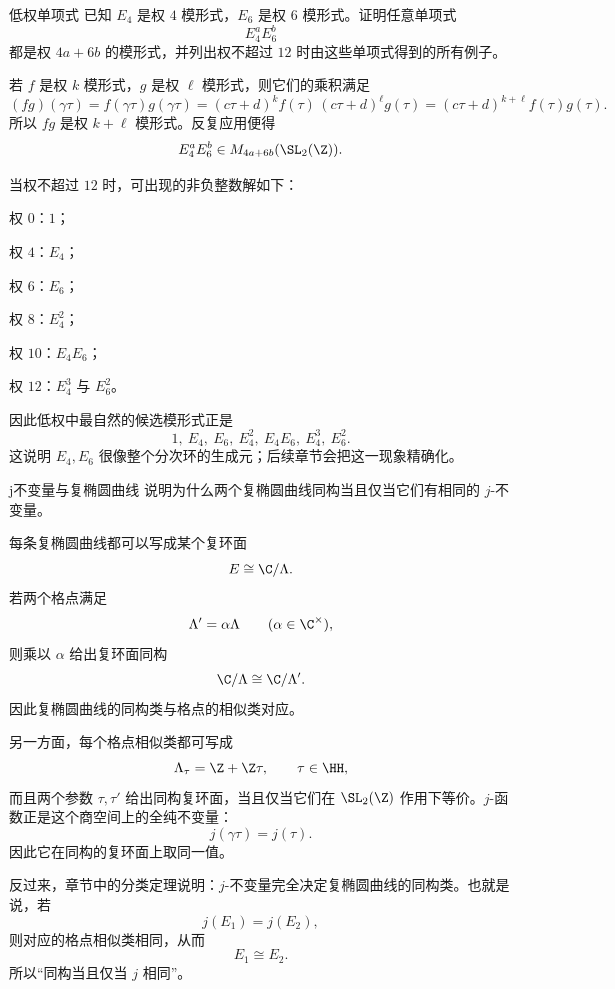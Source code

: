 \begin{problem}{低权单项式}
\hard
已知 $E_4$ 是权 $4$ 模形式，$E_6$ 是权 $6$ 模形式。证明任意单项式
\[
E_4^aE_6^b
\]
都是权 $4a+6b$ 的模形式，并列出权不超过 $12$ 时由这些单项式得到的所有例子。
\end{problem}
\begin{solution}
若 $f$ 是权 $k$ 模形式，$g$ 是权 $\ell$ 模形式，则它们的乘积满足
\[
(fg)(\gamma\tau)=f(\gamma\tau)g(\gamma\tau)
=(c\tau+d)^k f(\tau)\,(c\tau+d)^\ell g(\tau)
=(c\tau+d)^{k+\ell}f(\tau)g(\tau).
\]
所以 $fg$ 是权 $k+\ell$ 模形式。反复应用便得
\[
E_4^aE_6^b\in M_{4a+6b}(\SL_2(\Z)).
\]

当权不超过 $12$ 时，可出现的非负整数解如下：

权 $0$：$1$；

权 $4$：$E_4$；

权 $6$：$E_6$；

权 $8$：$E_4^2$；

权 $10$：$E_4E_6$；

权 $12$：$E_4^3$ 与 $E_6^2$。

因此低权中最自然的候选模形式正是
\[
1,\ E_4,\ E_6,\ E_4^2,\ E_4E_6,\ E_4^3,\ E_6^2.
\]
这说明 $E_4,E_6$ 很像整个分次环的生成元；后续章节会把这一现象精确化。
\end{solution}

\begin{problem}{j不变量与复椭圆曲线}
\hard
说明为什么两个复椭圆曲线同构当且仅当它们有相同的 $j$-不变量。
\end{problem}
\begin{solution}
每条复椭圆曲线都可以写成某个复环面
\[
E\cong \C/\Lambda.
\]
若两个格点满足
\[
\Lambda'=\alpha\Lambda\qquad (\alpha\in\C^{\times}),
\]
则乘以 $\alpha$ 给出复环面同构
\[
\C/\Lambda\cong \C/\Lambda'.
\]
因此复椭圆曲线的同构类与格点的相似类对应。

另一方面，每个格点相似类都可写成
\[
\Lambda_\tau=\Z+\Z\tau,
\qquad \tau\in\HH,
\]
而且两个参数 $\tau,\tau'$ 给出同构复环面，当且仅当它们在 $\SL_2(\Z)$ 作用下等价。$j$-函数正是这个商空间上的全纯不变量：
\[
j(\gamma\tau)=j(\tau).
\]
因此它在同构的复环面上取同一值。

反过来，章节中的分类定理说明：$j$-不变量完全决定复椭圆曲线的同构类。也就是说，若
\[
j(E_1)=j(E_2),
\]
则对应的格点相似类相同，从而
\[
E_1\cong E_2.
\]
所以“同构当且仅当 $j$ 相同”。
\end{solution}

